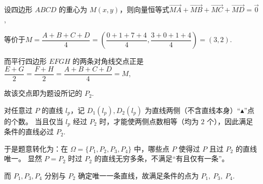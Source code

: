 \begin{solutions}

设四边形 $ABCD$ 的重心为 $M(x,y)$，则向量恒等式$\overrightarrow{MA}+\overrightarrow{MB}+\overrightarrow{MC}+\overrightarrow{MD}=\vec 0$,

等价于$M=\dfrac{A+B+C+D}{4}=\left(\dfrac{0+1+7+4}{4}, \dfrac{3+0+1+4}{4}\right)=(3,2)$.

而平行四边形 $EFGH$ 的两条对角线交点正是
$\dfrac{E+G}{2}=\dfrac{F+H}{2}=\dfrac{A+B+C+D}{4}=M$,

故该交点即为题设所记的 $P_2$.

对任意过 $P$ 的直线 $l_p$，记 $D_1(l_p),D_2(l_p)$ 为直线两侧（不含直线本身）“$\blacktriangle$”点的个数。
当且仅当 $l_p$ 经过 $P_2$ 时，才能使两侧点数相等（均为 $2$ 个），因此满足条件的直线必过 $P_2$.

于是题意转化为：在 $\Omega=\{P_1,P_2,P_3,P_4\}$ 中，哪些点 $P$ 使得过 $P$ 且过 $P_2$ 的直线唯一。
显然 $P=P_2$ 时过 $P_2$ 的直线无穷多条，不满足“有且仅有一条”。

而 $P_1,P_3,P_4$ 分别与 $P_2$ 确定唯一一条直线，故满足条件的点为 $P_1,\ P_3,\ P_4$.
\end{solutions}